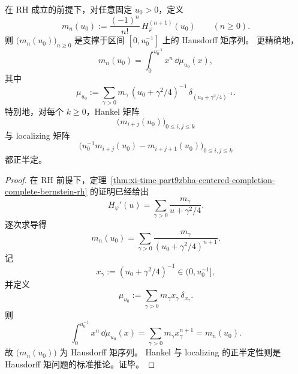 \begin{corollary}\label{cor:xi-time-part9zbha-centered-jet-hausdorff}
在 RH 成立的前提下，对任意固定 \(u_0>0\)，定义
\[
m_n(u_0)
:=
\frac{(-1)^n}{n!}\,H_\varphi^{(n+1)}(u_0)
\qquad (n\ge 0).
\]
则 \(\bigl(m_n(u_0)\bigr)_{n\ge 0}\) 是支撑于区间 \([0,u_0^{-1}]\) 上的 Hausdorff 矩序列。
更精确地，
\[
m_n(u_0)=\int_0^{u_0^{-1}}x^n\,\dd\mu_{u_0}(x),
\]
其中
\[
\mu_{u_0}
:=
\sum_{\gamma>0}
m_\gamma\,(u_0+\gamma^2/4)^{-1}\,
\delta_{(u_0+\gamma^2/4)^{-1}}.
\]
特别地，对每个 \(k\ge 0\)，Hankel 矩阵
\[
\bigl(m_{i+j}(u_0)\bigr)_{0\le i,j\le k}
\]
与 localizing 矩阵
\[
\bigl(u_0^{-1}m_{i+j}(u_0)-m_{i+j+1}(u_0)\bigr)_{0\le i,j\le k}
\]
都正半定。
\end{corollary}
\begin{proof}
在 RH 前提下，定理~\ref{thm:xi-time-part9zbha-centered-completion-complete-bernstein-rh} 的证明已经给出
\[
H_\varphi'(u)
=
\sum_{\gamma>0}\frac{m_\gamma}{u+\gamma^2/4}.
\]
逐次求导得
\[
m_n(u_0)
=
\sum_{\gamma>0}\frac{m_\gamma}{(u_0+\gamma^2/4)^{n+1}}.
\]
记
\[
x_\gamma:=(u_0+\gamma^2/4)^{-1}\in (0,u_0^{-1}],
\]
并定义
\[
\mu_{u_0}
:=
\sum_{\gamma>0}m_\gamma x_\gamma\,\delta_{x_\gamma}.
\]
则
\[
\int_0^{u_0^{-1}} x^n\,\dd\mu_{u_0}(x)
=
\sum_{\gamma>0}m_\gamma x_\gamma^{n+1}
=
m_n(u_0).
\]
故 \(\bigl(m_n(u_0)\bigr)\) 为 Hausdorff 矩序列。
Hankel 与 localizing 的正半定性则是 Hausdorff 矩问题的标准推论。证毕。
\end{proof}

